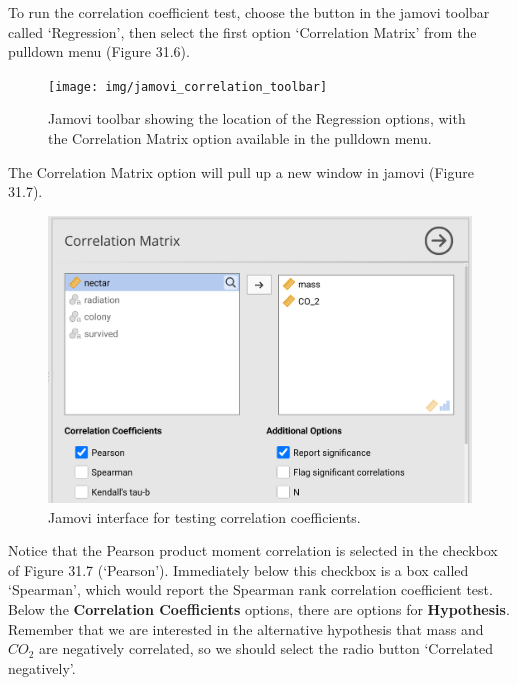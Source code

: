 \documentclass[
]{scrbook}
\begin{document}
\begin{verbatim}

\end{verbatim}

To run the correlation coefficient test, choose the button in the jamovi toolbar called `Regression', then select the first option `Correlation Matrix' from the pulldown menu (Figure 31.6).

\begin{figure}
\texttt{[image: img/jamovi\_correlation\_toolbar]} \caption{Jamovi toolbar showing the location of the Regression options, with the Correlation Matrix option available in the pulldown menu.}\label{fig:unnamed-chunk-157}
\end{figure}

The Correlation Matrix option will pull up a new window in jamovi (Figure 31.7).

\begin{figure}
\includegraphics[width=1\linewidth]{img/jamovi_correlation_interface} \caption{Jamovi interface for testing correlation coefficients.}\label{fig:unnamed-chunk-158}
\end{figure}

Notice that the Pearson product moment correlation is selected in the checkbox of Figure 31.7 (`Pearson').
Immediately below this checkbox is a box called `Spearman', which would report the Spearman rank correlation coefficient test.
Below the \textbf{Correlation Coefficients} options, there are options for \textbf{Hypothesis}.
Remember that we are interested in the alternative hypothesis that mass and \(CO_{2}\) are negatively correlated, so we should select the radio button `Correlated negatively'.
\end{document}
